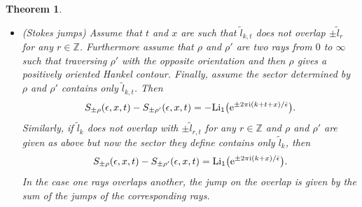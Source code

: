\documentclass[pdftex]{sigma}
\numberwithin{equation}{section}
\newtheorem{Theorem}{Theorem}[section]
\begin{document}
\begin{Theorem}
\begin{itemize}
 Furthermore, we have that for $\operatorname{Min}\{\operatorname{Im}(x),\operatorname{Im}(x+t)\}>0$, $\operatorname{Min}\{\operatorname{Re}(x),\operatorname{Re}(x+t)\}>0$, $\operatorname{Max}\{\operatorname{Re}(x),\operatorname{Re}(x+t)\}<1$; the following holds for $ \operatorname{Max}\{\operatorname{Re}(x),\operatorname{Re}(x+t)\}<\operatorname{Re}(\check\epsilon+1)$:
 \begin{equation}\label{SBSR}
 \Psi_{\mathbb{R}_{>0}}=\exp (S_{\mathbb{R}_{>0}}(\epsilon,x,t) )=\frac{\mathcal{S}_2(x\mid \check\epsilon,1)}{\mathcal{S}_2(t+x\mid \check\epsilon,1)}=\Psi_{{\rm np}}(\epsilon,x,t).
 \end{equation}
 \item {\rm (Stokes jumps)} Assume that $t$ and $x$ are such that $\widetilde{l}_{k,t}$ does not overlap $\pm \widetilde{l}_r$ for any $r\in \mathbb{Z}$. Furthermore assume that $\rho$ and $\rho'$ are two rays from $0$ to $\infty$ such that traversing $\rho'$ with the opposite orientation and then $\rho$ gives a positively oriented Hankel contour. Finally, assume the sector determined by $\rho$ and $\rho'$ contains only $\widetilde{l}_{k,t}$. Then
\begin{equation*}
 S_{\pm \rho}(\epsilon,x,t)-S_{\pm \rho'}(\epsilon,x,t)=-\mathrm{Li}_1\big({\rm e}^{\pm 2\pi \mathrm{i}(k+t+x)/\check{\epsilon}}\big).
\end{equation*}
Similarly, if $\widetilde{l}_k$ does not overlap with $\pm \widetilde{l}_{r,t}$ for any $r\in \mathbb{Z}$ and $\rho$ and $\rho'$ are given as above but now the sector they define contains only $\widetilde{l}_k$, then
\begin{equation*}
 S_{\pm \rho}(\epsilon,x,t)-S_{\pm \rho'}(\epsilon,x,t)=\mathrm{Li}_1\big({\rm e}^{\pm 2\pi \mathrm{i}(k+x)/\check{\epsilon}}\big).
\end{equation*}
In the case one rays overlaps another, the jump on the overlap is given by the sum of the jumps of the corresponding rays.


\end{itemize}
\end{Theorem}
\end{document}
